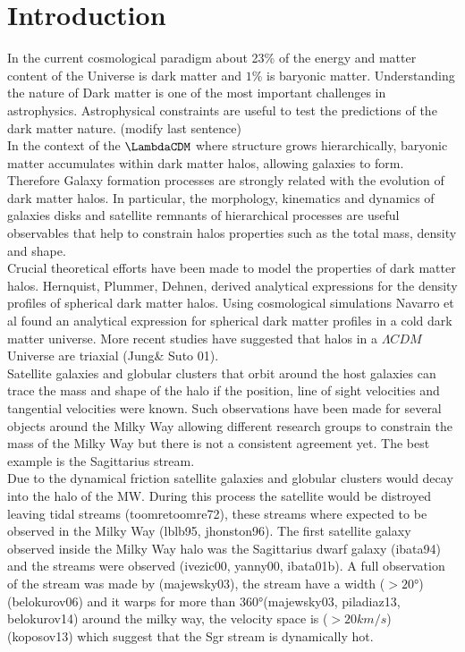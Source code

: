 \label{sec:intro}
\section{Introduction}

In the current cosmological paradigm about 23\% of the energy and matter
content of the Universe is dark matter and $1\%$ is baryonic matter.
Understanding the nature of Dark matter is one of the most important challenges in
astrophysics. Astrophysical constraints are useful to test the predictions
of the dark matter nature. (modify last sentence)\\

In the context of the $\LambdaCDM$ where structure grows hierarchically, baryonic matter
accumulates within dark matter halos, allowing galaxies to form. Therefore
Galaxy formation processes are strongly related with the evolution of dark
matter halos. In particular, the morphology, kinematics and dynamics of galaxies
disks and satellite remnants of hierarchical processes
are useful observables that help to constrain halos properties such as
the total mass, density and shape.\\

Crucial theoretical efforts have been made to model the properties of dark
matter halos. Hernquist, Plummer, Dehnen, derived analytical expressions for
the density profiles of spherical dark matter halos. Using cosmological
simulations Navarro et al found an analytical expression for spherical
dark matter profiles in a cold dark matter universe. More recent studies have
suggested that halos in a $\Lambda CDM$ Universe are triaxial (Jung\& Suto 01).\\


Satellite galaxies and globular clusters that orbit around the host
galaxies can trace the mass and shape of the halo if the position, line of
sight velocities and tangential velocities were known. Such observations
have been made for several objects around the Milky Way allowing different 
research groups to constrain the mass of the Milky Way but there is not a consistent
agreement yet. The best example is the Sagittarius stream.\\

Due to the dynamical friction satellite galaxies and globular clusters would decay into 
the halo of the MW. During this process the satellite would be distroyed leaving 
tidal streams (toomretoomre72), these streams where expected to be observed 
in the Milky Way (lblb95, jhonston96). 
The first satellite galaxy observed inside the Milky Way halo was the Sagittarius dwarf 
galaxy (ibata94) and the streams were observed (ivezic00, yanny00, ibata01b). 
A full observation of the stream was made by (majewsky03), the stream  
have a width ($>20°$) (belokurov06) and it warps
for more than $360°$(majewsky03, piladiaz13, belokurov14) around the milky way, 
the velocity space is ($>20km/s$) (koposov13) which suggest that
the Sgr stream is dynamically hot.\\

